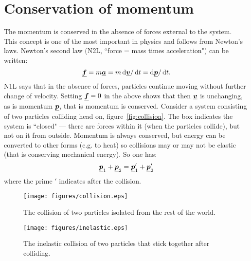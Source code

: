 \section{Conservation of momentum}
The momentum is conserved in the absence of forces external to the system.  \\
This concept is one of the most important in physics and follows from Newton's laws.  Newton's second law (N2L, ``force = mass times acceleration") can be written:
\begin{equation*} \mathit{\underline{\boldsymbol{f}}} = m \mathit{\underline{\boldsymbol{a}}} = m \operatorname{d}\!\mathit{\underline{\boldsymbol{v}}}/\operatorname{d}\! t = \operatorname{d}\!\mathit{\underline{\boldsymbol{p}}}/\operatorname{d}\! t .
\end{equation*}
N1L says that in the absence of forces, particles continue moving without further change of velocity.  Setting $\mathit{\underline{\boldsymbol{f}}}= 0$ in the above shows that then $\mathit{\underline{\boldsymbol{v}}}$ is unchanging, as is momentum $\mathit{\underline{\boldsymbol{p}}}$, that is momentum is conserved.\nll
Consider a system consisting of two particles colliding head on, figure~\ref{fig:collision}. The box indicates the system is ``closed" --- there are forces within it (when the particles collide), but not on it from outside.
\nll
Momentum is always conserved, but energy can be converted to other forms (e.g. to heat) so collisions may or may not be elastic (that is conserving mechanical energy).  So one has:
\begin{equation*} \mathit{\underline{\boldsymbol{p}}}_1 +  \mathit{\underline{\boldsymbol{p}}}_2 = \mathit{\underline{\boldsymbol{p}}}_1'  + \mathit{\underline{\boldsymbol{p}}}_2'
\end{equation*}
where the prime $'$ indicates after the collision.
\begin{figure}[h!]%
\centering
\begin{minipage}{.45\textwidth}
  \centering
  \texttt{[image: figures/collision.eps]}
  \caption{The collision of two particles isolated from the rest of the world.}
  \label{fig:collision}
\end{minipage}\hfil
\begin{minipage}{.45\textwidth}
  \centering
  \texttt{[image: figures/inelastic.eps]}
  \caption{The inelastic collision of two particles that stick together after colliding.}
  \label{fig:inelastic}
\end{minipage}
\end{figure}
\vspace{-0.5cm}
